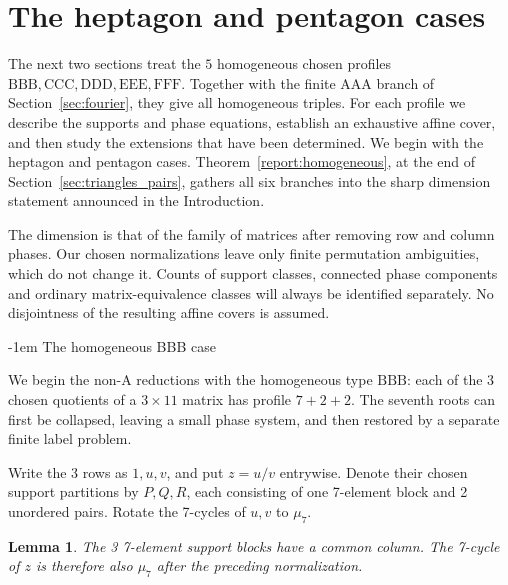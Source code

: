 \documentclass[11pt,a4paper]{article}
\makeatletter
\newtheorem{lemma}[theorem]{Lemma}
\theoremstyle{plain}
\theoremstyle{definition}
\theoremstyle{plain}
\renewcommand\subsection{\@startsection{subsection}{2}{\z@}  {\medskipamount}  {-1em}  {\normalfont\normalsize\bfseries}}
\makeatother
\begin{document}
\section{The heptagon and pentagon cases}\label{sec:homogeneous}\label{sec:heptagons_pentagons}
The next two sections treat the $5$ homogeneous chosen profiles $\mathrm{BBB},\mathrm{CCC},\mathrm{DDD},\mathrm{EEE},\mathrm{FFF}$. Together with the finite $\mathrm{AAA}$ branch of Section~\ref{sec:fourier}, they give all homogeneous triples. For each profile we describe the supports and phase equations, establish an exhaustive affine cover, and then study the extensions that have been determined. We begin with the heptagon and pentagon cases. Theorem~\ref{report:homogeneous}, at the end of Section~\ref{sec:triangles_pairs}, gathers all six branches into the sharp dimension statement announced in the Introduction.

The dimension is that of the family of matrices after removing row and column phases. Our chosen normalizations leave only finite permutation ambiguities, which do not change it. Counts of support classes, connected phase components and ordinary matrix-equivalence classes will always be identified separately. No disjointness of the resulting affine covers is assumed.

\subsection{The homogeneous BBB case}\label{sec:BBB}

\medskip
We begin the non-$\mathrm{A}$ reductions with the homogeneous type $\mathrm{BBB}$: each of the 3 chosen quotients of a $3\times11$ matrix has profile $7+2+2$. The seventh roots can first be collapsed, leaving a small phase system, and then restored by a separate finite label problem.

Write the 3 rows as $1,u,v$, and put $z=u/v$ entrywise. Denote their chosen support partitions by $P,Q,R$, each consisting of one 7-element block and 2 unordered pairs. Rotate the 7-cycles of $u,v$ to $\mu_7$.

\par\addvspace{\medskipamount}\noindent
\begin{minipage}{\linewidth}
\begin{lemma}\label{n11_noA_BBB:common}
The 3 7-element support blocks have a common column. The 7-cycle of $z$ is therefore also $\mu_7$ after the preceding normalization.
\end{lemma}
\end{minipage}
\par\addvspace{\medskipamount}
\end{document}
